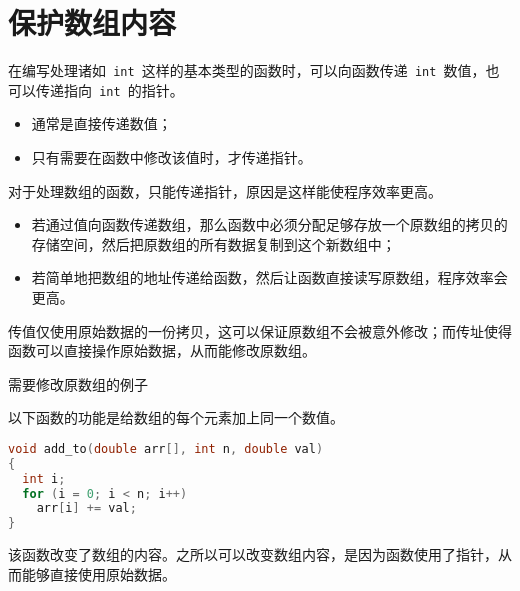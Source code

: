 \section{保护数组内容}
\begin{frame}[fragile]\ft{\secname}
在编写处理诸如\lstinline| int |这样的基本类型的函数时，可以向函数传递\lstinline| int |数值，也可以传递指向\lstinline| int |的指针。\vspace{0.05in}

\begin{itemize}
\item 通常是直接传递数值；\\[0.1in]
\item 只有需要在函数中修改该值时，才传递指针。
\end{itemize}
\end{frame}


\begin{frame}[fragile]\ft{\secname}
对于处理数组的函数，只能传递指针，原因是这样能使程序效率更高。\vspace{0.05in}

\begin{itemize}
\item 若通过值向函数传递数组，那么函数中必须分配足够存放一个原数组的拷贝的存储空间，然后把原数组的所有数据复制到这个新数组中；\\[0.1in]
\item 若简单地把数组的地址传递给函数，然后让函数直接读写原数组，程序效率会更高。
\end{itemize}
\end{frame}

\begin{frame}[fragile]\ft{\secname}
传值仅使用原始数据的一份拷贝，这可以保证原数组不会被意外修改；而传址使得函数可以直接操作原始数据，从而能修改原数组。
\end{frame}

\begin{frame}[fragile]\ft{\secname}
\begin{center}
需要修改原数组的例子
\end{center}
以下函数的功能是给数组的每个元素加上同一个数值。
\begin{lstlisting}[language=c,backgroundcolor=\color{red!20}]
void add_to(double arr[], int n, double val)
{
  int i;
  for (i = 0; i < n; i++)
    arr[i] += val;
}
\end{lstlisting} \pause 
该函数改变了数组的内容。之所以可以改变数组内容，是因为函数使用了指针，从而能够直接使用原始数据。
\end{frame}

